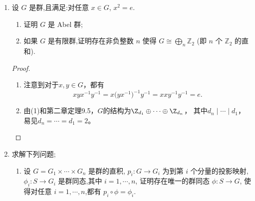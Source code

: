 \begin{enumerate}
\begin{proof}[解答]
\begin{enumerate}[label=(\arabic*)]
\begin{itemize}
    那么只能是$\langle g_1 \rangle\times\langle g_2 \rangle$，
    可是$(g_1,e_2)$属于$\langle g_1 \rangle\times\langle g_2 \rangle$却不属于$H$；
    \item 有$g_2 \in G_2$使得$o_2=\infty$，同上；
    \item 有$g_1 \in G_1,g_2 \in G_2$使得$o_1,o_2<\infty$
    且$\operatorname{gcd}(o_1,o_2)>1$，考察$(g_1,g_2)$生成的子群$H$。
    假定$H$是直积的话只能是$\langle g_1 \rangle\times\langle g_2 \rangle$，
    可是$H$是$\operatorname{lcm}(o_1,o_2)$阶循环群，
    其阶数小于$\langle g_1 \rangle\times\langle g_2 \rangle$的阶数$o_1o_2$。\qedhere
    \end{itemize}
    \end{enumerate}
\end{proof}
\item 设 $G$ 是群,且满足:对任意 $x \in G$, $x^2 = e$.
\begin{enumerate}[label=(\arabic*)]
\item 证明 $G$ 是 Abel 群;
\item 如果 $G$ 是有限群,证明存在非负整数 $n$ 使得 $G \cong \bigoplus\limits_{n} \mathbb{Z}_2$ (即 $n$ 个 $\mathbb{Z}_2$ 的直和).
\end{enumerate}
\begin{proof}
    \begin{enumerate}[label=(\arabic*)]
    \item 注意到对于$x,y \in G$，都有
    \[xyx^{-1}y^{-1}=x\big(yx^{-1}\big)^{-1}y^{-1}=xxy^{-1}y^{-1}=e.\]
    \item 由(1)和第二章定理9.5，$G$的结构为$\Z_{d_1}\oplus\cdots\oplus\Z_{d_n}$，
    其中$d_n \mid\cdots\mid d_1$，易见$d_n=\cdots=d_1=2$。\qedhere
    \end{enumerate}
\end{proof}
\item 求解下列问题;
\begin{enumerate}[label=(\arabic*)]
\item 设 $G = G_1 \times \cdots \times G_n$ 是群的直积, 
$p_i : G \rightarrow G_i$ 为到第 $i$ 个分量的投影映射, 
$\phi_i : S \rightarrow G_i$ 是群同态,其中 $i = 1,\cdots, n$,
证明存在唯一的群同态 $\phi : S \rightarrow G$,
使得对任意 $i = 1, \cdots, n$,都有 $p_i \circ \phi = \phi_i$. 


\end{enumerate}
\end{enumerate}
